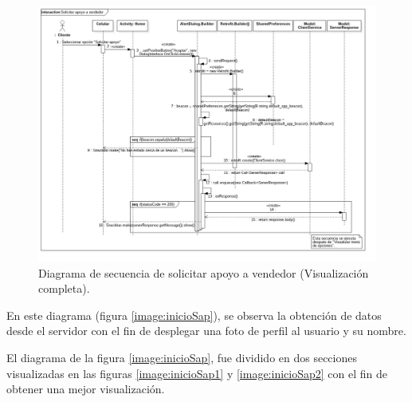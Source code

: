 \FloatBarrier
\begin{figure}[htbp!]
		\centering
			\includegraphics[width=1.1 \textwidth]{imagenes/Diagramas_UserApp/Nuevos_diagramas/solicitarApoyo}
		\caption{Diagrama de secuencia de solicitar apoyo a vendedor (Visualización completa).}
		\label{image:solicita}
\end{figure}
\FloatBarrier
En este diagrama (figura \ref{image:inicioSap}), se observa la obtención de datos desde el servidor con el fin de desplegar una foto de perfil al usuario y su nombre. \\ \par
El diagrama de la figura \ref{image:inicioSap}, fue dividido en dos secciones visualizadas en las figuras \ref{image:inicioSap1} y \ref{image:inicioSap2} con el fin de obtener una mejor visualización.\\ \par
\FloatBarrier
